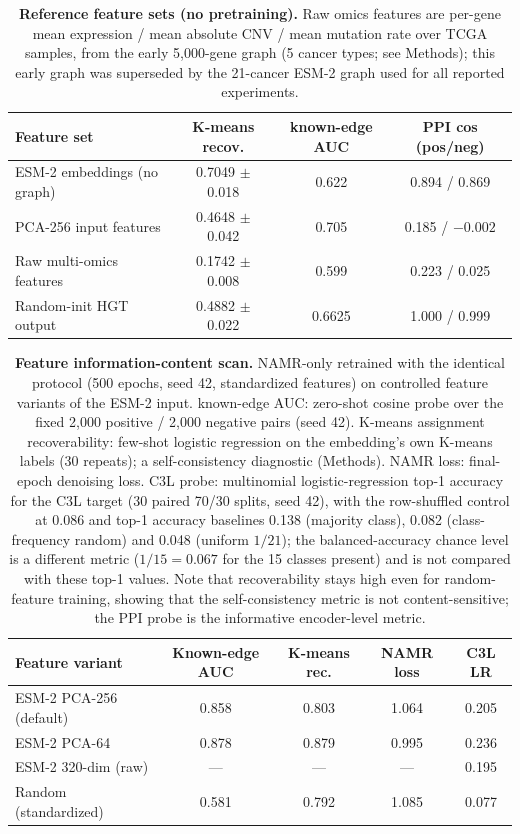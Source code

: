 \documentclass[11pt,a4paper]{article}
\begin{document}
\begin{table}[H]
\centering
\caption{\textbf{Reference feature sets (no pretraining).} Raw omics features are per-gene mean expression / mean absolute CNV / mean mutation rate over TCGA samples, from the early 5,000-gene graph (5 cancer types; see Methods); this early graph was superseded by the 21-cancer ESM-2 graph used for all reported experiments.}
\label{tab:s5}
\footnotesize
\begin{tabular}{@{}lccc@{}}
\toprule
\textbf{Feature set} & \textbf{K-means recov.} & \textbf{known-edge AUC} & \textbf{PPI cos (pos/neg)} \\
\midrule
ESM-2 embeddings (no graph) & 0.7049 $\pm$ 0.018 & 0.622 & 0.894 / 0.869 \\
PCA-256 input features & 0.4648 $\pm$ 0.042 & 0.705 & 0.185 / $-0.002$ \\
Raw multi-omics features & 0.1742 $\pm$ 0.008 & 0.599 & 0.223 / 0.025 \\
Random-init HGT output & 0.4882 $\pm$ 0.022 & 0.6625 & 1.000 / 0.999 \\
\bottomrule
\end{tabular}
\end{table}

\begin{table}[H]
\centering
\caption{\textbf{Feature information-content scan.} NAMR-only retrained with the identical protocol (500 epochs, seed 42, standardized features) on controlled feature variants of the ESM-2 input. known-edge AUC: zero-shot cosine probe over the fixed 2,000 positive / 2,000 negative pairs (seed 42). K-means assignment recoverability: few-shot logistic regression on the embedding's own K-means labels (30 repeats); a self-consistency diagnostic (Methods). NAMR loss: final-epoch denoising loss. C3L probe: multinomial logistic-regression top-1 accuracy for the C3L target (30 paired 70/30 splits, seed 42), with the row-shuffled control at 0.086 and top-1 accuracy baselines 0.138 (majority class), 0.082 (class-frequency random) and 0.048 (uniform $1/21$); the balanced-accuracy chance level is a different metric ($1/15 = 0.067$ for the 15 classes present) and is not compared with these top-1 values. Note that recoverability stays high even for random-feature training, showing that the self-consistency metric is not content-sensitive; the PPI probe is the informative encoder-level metric.}
\label{tab:s16}
\footnotesize
\begin{tabular}{@{}lcccc@{}}
\toprule
\textbf{Feature variant} & \textbf{Known-edge AUC} & \textbf{K-means rec.} & \textbf{NAMR loss} & \textbf{C3L LR} \\
\midrule
ESM-2 PCA-256 (default) & 0.858 & 0.803 & 1.064 & 0.205 \\
ESM-2 PCA-64 & 0.878 & 0.879 & 0.995 & 0.236 \\
ESM-2 320-dim (raw) & --- & --- & --- & 0.195 \\
Random (standardized) & 0.581 & 0.792 & 1.085 & 0.077 \\
\bottomrule
\end{tabular}
\end{table}
\end{document}
